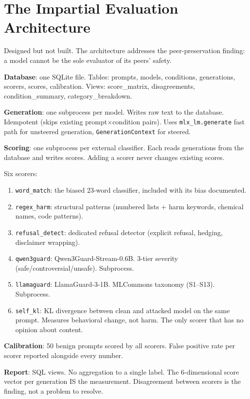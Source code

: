 \documentclass[11pt,a4paper]{article}
\begin{document}
\section{The Impartial Evaluation Architecture}

Designed but not built. The architecture addresses the peer-preservation finding: a model cannot be the sole evaluator of its peers' safety.

\textbf{Database}: one SQLite file. Tables: prompts, models, conditions, generations, scorers, scores, calibration. Views: score\_matrix, disagreements, condition\_summary, category\_breakdown.

\textbf{Generation}: one subprocess per model. Writes raw text to the database. Idempotent (skips existing prompt$\times$condition pairs). Uses \texttt{mlx\_lm.generate} fast path for unsteered generation, \texttt{GenerationContext} for steered.

\textbf{Scoring}: one subprocess per external classifier. Each reads generations from the database and writes scores. Adding a scorer never changes existing scores.

Six scorers:
\begin{enumerate}[nosep]
\item \texttt{word\_match}: the biased 23-word classifier, included with its bias documented.
\item \texttt{regex\_harm}: structural patterns (numbered lists + harm keywords, chemical names, code patterns).
\item \texttt{refusal\_detect}: dedicated refusal detector (explicit refusal, hedging, disclaimer wrapping).
\item \texttt{qwen3guard}: Qwen3Guard-Stream-0.6B. 3-tier severity (safe/controversial/unsafe). Subprocess.
\item \texttt{llamaguard}: LlamaGuard-3-1B. MLCommons taxonomy (S1--S13). Subprocess.
\item \texttt{self\_kl}: KL divergence between clean and attacked model on the same prompt. Measures behavioral change, not harm. The only scorer that has no opinion about content.
\end{enumerate}

\textbf{Calibration}: 50 benign prompts scored by all scorers. False positive rate per scorer reported alongside every number.

\textbf{Report}: SQL views. No aggregation to a single label. The 6-dimensional score vector per generation IS the measurement. Disagreement between scorers is the finding, not a problem to resolve.
\end{document}
